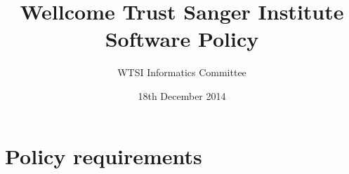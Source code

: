\documentclass[10pt,a4paper]{article}
\begin{document}
\title{
Wellcome Trust Sanger Institute \\
Software Policy
}
\author{WTSI Informatics Committee}
\date{18th December 2014}

\maketitle

\newcommand{\exectitle}[0]{Chief Operating Officer}

\newcommand{\execperson}[0]{Martin Dougherty} 

\newcommand{\filename}[1]{\texttt{#1}} 

\newenvironment{boilerplate}[1][]
  {\minipage{\linewidth}%
   \lstset{basicstyle=\ttfamily\footnotesize,breaklines=false,frame=shadowbox,rulesepcolor=\color{blue},#1}}
   {\endminipage}%

\setlength{\parindent}{0pt} %

\setlength{\parskip}{4mm plus2mm minus2mm}

\let\stdsection\section
\renewcommand\section{\newpage\stdsection}




\section{Policy requirements}
\label{section:policy}

\end{document}
